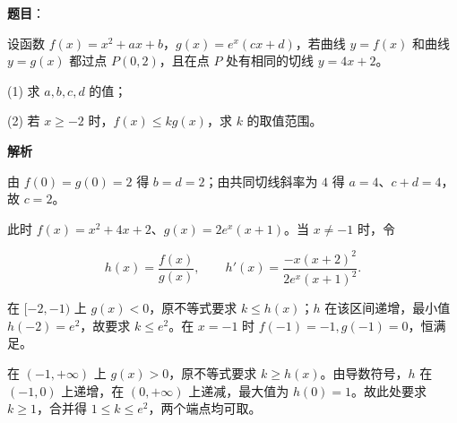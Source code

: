 \begin{answer}

\textbf{题目}：

设函数 $f(x)=x^2+ax+b$，$g(x)=e^x(cx+d)$，若曲线 $y=f(x)$ 和曲线 $y=g(x)$ 都过点 $P(0,2)$，且在点 $P$ 处有相同的切线 $y=4x+2$。

(1) 求 $a,b,c,d$ 的值；

(2) 若 $x\geqslant-2$ 时，$f(x)\leqslant kg(x)$，求 $k$ 的取值范围。

\textbf{解析}


由 $f(0)=g(0)=2$ 得 $b=d=2$；由共同切线斜率为 $4$ 得 $a=4$、$c+d=4$，故 $c=2$。


此时 $f(x)=x^2+4x+2$、$g(x)=2e^x(x+1)$。当 $x\ne-1$ 时，令

\nopagebreak[4]
\[
h(x)=\frac{f(x)}{g(x)},\qquad
h'(x)=\frac{-x(x+2)^2}{2e^x(x+1)^2}.
\]

在 $[-2,-1)$ 上 $g(x)<0$，原不等式要求 $k\leqslant h(x)$；$h$ 在该区间递增，最小值 $h(-2)=e^2$，故要求 $k\leqslant e^2$。在 $x=-1$ 时 $f(-1)=-1,g(-1)=0$，恒满足。

在 $(-1,+\infty)$ 上 $g(x)>0$，原不等式要求 $k\geqslant h(x)$。由导数符号，$h$ 在 $(-1,0)$ 上递增，在 $(0,+\infty)$ 上递减，最大值为 $h(0)=1$。故此处要求 $k\geqslant1$，合并得 $1\leqslant k\leqslant e^2$，两个端点均可取。



\end{answer}
